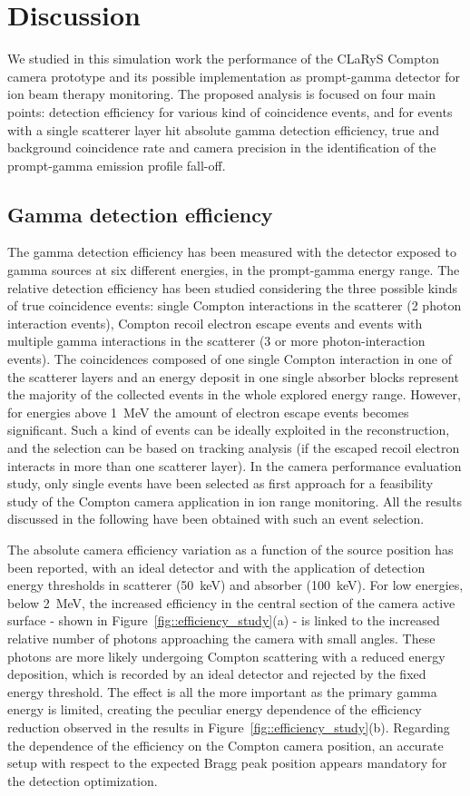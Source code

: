 \section{Discussion}

We studied in this simulation work the performance of the CLaRyS Compton camera prototype and its possible implementation as prompt-gamma detector for ion beam therapy monitoring. The proposed analysis is focused on four main points: detection efficiency for various kind of coincidence events, and for events with a single scatterer layer hit absolute gamma detection efficiency, true and background coincidence rate and camera precision in the identification of the prompt-gamma emission profile fall-off.

\subsection{Gamma detection efficiency}
The gamma detection efficiency has been measured with the detector exposed to gamma sources at six different energies, in the prompt-gamma energy range. The relative detection efficiency has been studied considering the three possible kinds of true coincidence events: single Compton interactions in the scatterer (2 photon interaction events), Compton recoil electron escape events and events with multiple gamma interactions in the scatterer (3 or more photon-interaction events). The coincidences composed of one single Compton interaction in one of the scatterer layers and an energy deposit in one single absorber blocks represent the majority of the collected events in the whole explored energy range. However, for energies above 1~MeV the amount of electron escape events becomes significant. Such a kind of events can be ideally exploited in the reconstruction, and the selection can be based on tracking analysis (if the escaped recoil electron interacts in more than one scatterer layer). In the camera performance evaluation study, only single events have been selected as first approach for a feasibility study of the Compton camera application in ion range monitoring. 
All the results discussed in the following have been obtained with such an event selection.

The absolute camera efficiency variation as a function of the source position has been reported, with an ideal detector and with the application of detection energy thresholds in scatterer (50~keV) and absorber (100~keV). 
For low energies, below 2~MeV, the increased efficiency in the central section of the camera active surface - shown in Figure~\ref{fig::efficiency_study}(a) - is linked to the increased relative number of photons approaching the camera with small angles. These photons are more likely undergoing Compton scattering with a reduced energy deposition, which is recorded by an ideal detector and rejected by the fixed energy threshold. The effect is all the more important as the primary gamma energy is limited, creating the peculiar energy dependence of the efficiency reduction observed in the results in Figure~\ref{fig::efficiency_study}(b).
Regarding the dependence of the efficiency on the Compton camera position, an accurate setup with respect to the expected Bragg peak position appears mandatory for the detection optimization.

